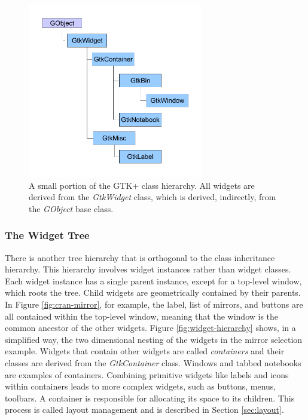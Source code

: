 \documentclass[article]{jss}
\begin{document}
\begin{figure}
\begin{center}
\includegraphics[width=3in]{class-hierarchy.pdf}
\caption{\label{fig:class-hierarchy}A small portion of the GTK+ class hierarchy. 
All widgets are derived from the \emph{GtkWidget} class, which is derived, 
indirectly, from the \emph{GObject} base class.}
\end{center}
\end{figure}

\subsubsection{The Widget Tree}

There is another tree hierarchy that is orthogonal to the 
class inheritance hierarchy. This hierarchy involves widget instances rather
than widget classes. Each widget instance has a single parent instance, except
for a top-level window, which roots the tree. Child widgets are geometrically
contained by their parents. In Figure \ref{fig:cran-mirror}, 
for example, the label, list of mirrors, and buttons are all contained within the 
top-level window, meaning that the window is the common ancestor of the other widgets.
Figure \ref{fig:widget-hierarchy} shows, in a simplified way, the two dimensional
nesting of the widgets in the mirror selection example. Widgets that contain 
other widgets are called \emph{containers} and their classes are derived from 
the \emph{GtkContainer} class. Windows and tabbed notebooks are examples of containers.
Combining primitive widgets like labels and icons within containers
leads to more complex widgets, such as buttons, menus, toolbars. A container is 
responsible for allocating its space to its children. This process is called
layout management and is described in Section \ref{sec:layout}.
\end{document}
